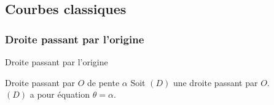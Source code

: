 \documentclass[14pt]{beamer}
\begin{document}
\subsection{Courbes classiques}
\subsubsection{Droite passant par l'origine}
\begin{frame}{Droite passant par l'origine}
        \begin{alertblock}{Droite passant par $O$ de pente $\alpha$}
                Soit $(D)$ une droite passant par $O$.\\
                $(D)$ a pour équation $\theta=\alpha$.\\
                \begin{center}
                \end{center}
        \end{alertblock}
\end{frame}
\end{document}
